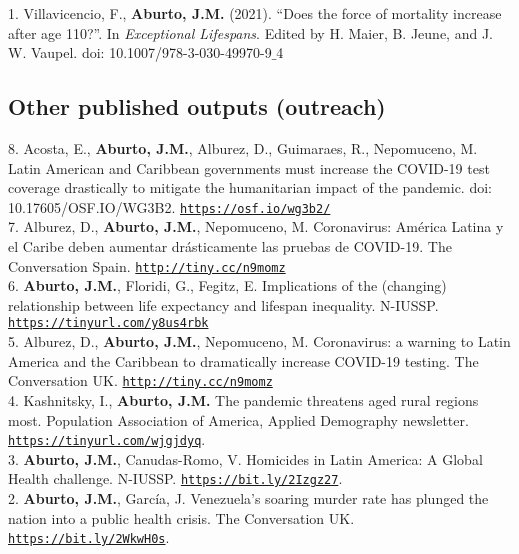 \documentclass[12pt]{article}
\providecommand*\url[1]{\href{#1}{#1}}
\renewcommand*\url[1]{\href{#1}{\texttt{#1}}}
\begin{document}
1. Villavicencio, F., \textbf{Aburto, J.M.} (2021). ``Does the force of mortality increase after age 110?''. In \emph{Exceptional Lifespans}. Edited by H. Maier, B. Jeune, and J. W. Vaupel. doi: 10.1007/978-3-030-49970-9$\_$4\\
		  		  
\subsection*{Other published outputs (outreach)}	

8. Acosta, E., \textbf{Aburto, J.M.}, Alburez, D., Guimaraes, R., Nepomuceno, M.  Latin American and Caribbean governments must increase the COVID-19 test coverage drastically to mitigate the humanitarian impact of the pandemic. doi: 10.17605/OSF.IO/WG3B2. \url{https://osf.io/wg3b2/}\\

7. Alburez, D., \textbf{Aburto, J.M.}, Nepomuceno, M. Coronavirus: América Latina y el Caribe deben aumentar drásticamente las pruebas de COVID-19. The Conversation Spain. \url{http://tiny.cc/n9momz}\\

6. \textbf{Aburto, J.M.}, Floridi, G., Fegitz, E. Implications of the (changing) relationship between life expectancy and lifespan inequality. N-IUSSP. \url{https://tinyurl.com/y8us4rbk}\\

5. Alburez, D., \textbf{Aburto, J.M.}, Nepomuceno, M. Coronavirus: a warning to Latin America and the Caribbean to dramatically increase COVID-19 testing. The Conversation UK. \url{http://tiny.cc/n9momz}\\

4. Kashnitsky, I., \textbf{Aburto, J.M.} The pandemic threatens aged rural regions most. Population Association of America, Applied Demography newsletter. \url{https://tinyurl.com/wjgjdyq}.\\

3. \textbf{Aburto, J.M.}, Canudas-Romo, V. Homicides in Latin America: A Global Health challenge. N-IUSSP. \url{https://bit.ly/2Izgz27}.\\

2. \textbf{Aburto, J.M.}, Garc\'ia, J. Venezuela's soaring murder rate has plunged the nation into a public health crisis. The Conversation UK.\\ \url{https://bit.ly/2WkwH0s}.\\
\end{document}
